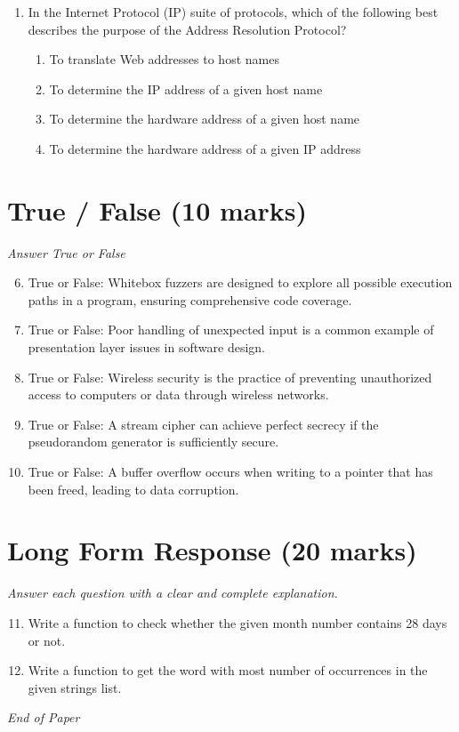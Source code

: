 \documentclass[12pt]{article}
\begin{document}
\begin{enumerate}[label=\arabic*.]
\begin{enumerate}[label=(\alph*)]
\end{enumerate}
\item In the Internet Protocol (IP) suite of protocols, which of the following best describes the purpose of the Address Resolution Protocol?
\begin{enumerate}[label=(\alph*)]
    \item To translate Web addresses to host names
    \item To determine the IP address of a given host name
    \item To determine the hardware address of a given host name
    \item To determine the hardware address of a given IP address
\end{enumerate}
\end{enumerate}

\section*{True / False (10 marks)}
\textit{Answer True or False}
\begin{enumerate}[label=\arabic*.]
\setcounter{enumi}{5}
\item True or False: Whitebox fuzzers are designed to explore all possible execution paths in a program, ensuring comprehensive code coverage.
\item True or False: Poor handling of unexpected input is a common example of presentation layer issues in software design.
\item True or False: Wireless security is the practice of preventing unauthorized access to computers or data through wireless networks.
\item True or False: A stream cipher can achieve perfect secrecy if the pseudorandom generator is sufficiently secure.
\item True or False: A buffer overflow occurs when writing to a pointer that has been freed, leading to data corruption.
\end{enumerate}

\section*{Long Form Response (20 marks)}
\textit{Answer each question with a clear and complete explanation.}
\begin{enumerate}[label=\arabic*.]
\setcounter{enumi}{10}
\item Write a function to check whether the given month number contains 28 days or not.
\item Write a function to get the word with most number of occurrences in the given strings list.
\end{enumerate}

\vfill
\noindent\textit{End of Paper}
\end{document}
